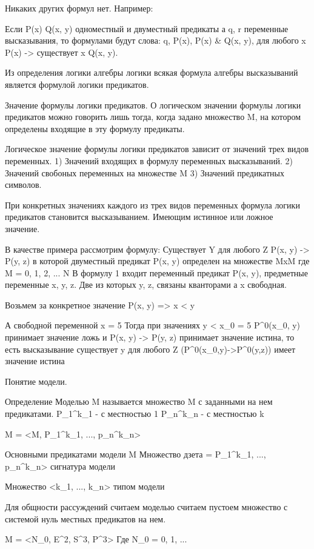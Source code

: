 Никаких других формул нет. Например:

Если P(x) Q(x, y) одноместный и двуместный предикаты а q, r переменные высказывания, то формулами будут слова:
q, P(x), P(x) & Q(x, y), для любого x P(x) -> существует x Q(x, y).

Из определения логики алгебры логики всякая формула алгебры высказываний является формулой логики предикатов.


Значение формулы логики предикатов.
О логическом значении формулы логики предикатов можно говорить лишь тогда, когда задано множество M, на котором определены входящие в эту формулу предикаты.

Логическое значение формулы логики предикатов зависит от значений трех видов переменных.
1) Значений входящих в формулу переменных высказываний.
2) Значений свобоных переменных на множестве M
3) Значений предикатных символов.

При конкретных значениях каждого из трех видов переменных формула логики предикатов становится высказыванием.
Имеющим истинное или ложное значение.

В качестве примера рассмотрим формулу:
Существует Y для любого Z P(x, y) -> P(y, z) в которой двуместный предикат P(x, y) определен на множестве MxM где M = { 0, 1, 2, ... N}
В формулу 1 входит переменный предикат P(x, y), предметные переменные x, y, z. Две из которых y, z, связаны кванторами а x свободная.

Возьмем за конкретное значение P(x, y) => x < y

А свободной переменной x = 5
Тогда при значениях y < x_0  = 5
P^0(x_0, y) принимает значение ложь и P(x, y) -> P(y, z) принимает значение истина, то есть высказывание существует y для любого Z
(P^0(x_0,y)->P^0(y,z)) имеет значение истина

Понятие модели.

Определение
Моделью M называется множество M с заданными на нем предикатами.
P_1^k_1 - с местностью 1
P_n^k_n - с местностью k

M = <M, P_1^k_1, ..., p_n^k_n>

Основными предикатами модели M
Множество дзета = P_1^k_1, ..., p_n^k_n> сигнатура модели

Множество <k_1, ..., k_n> типом модели

Для общности рассуждений считаем моделью считаем пустоем множество с системой нуль местных предикатов на нем.

M = <N_0, E^2, S^3, P^3>
Где N_0 = {0, 1, ...}

